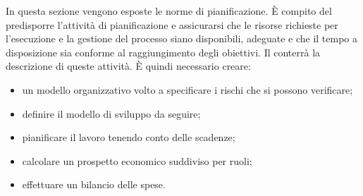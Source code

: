  In questa sezione vengono esposte le norme di pianificazione. È compito del \respProg{} predisporre l'attività di pianificazione e assicurarsi che le risorse richieste per l'esecuzione e la gestione del processo siano disponibili, adeguate e che il tempo a disposizione sia conforme al raggiungimento degli obiettivi. Il \PdP{} conterrà la descrizione di queste attività. È quindi necessario creare:
\begin{itemize}
	\item{un modello organizzativo volto a specificare i rischi che si possono verificare;}
	\item{definire il modello di sviluppo da seguire;}
	\item{pianificare il lavoro tenendo conto delle scadenze;}
	\item{calcolare un prospetto economico suddiviso per ruoli;}
	\item{effettuare un bilancio delle spese.}
\end{itemize}